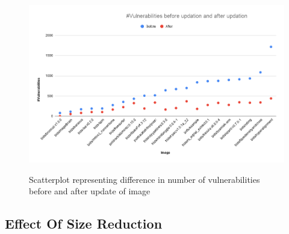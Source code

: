 \documentclass[a4paper,num-refs]{oup-contemporary}
\begin{document}
\begin{figure}[!htb]
        {\includegraphics[width=\columnwidth]
        {Figures/afterupdate.png}}
        \caption{\label{fig:graph2} Scatterplot representing difference in number of vulnerabilities before and 
	after update of image}
      \end{figure}
\subsection{Effect Of Size Reduction}


\end{document}
